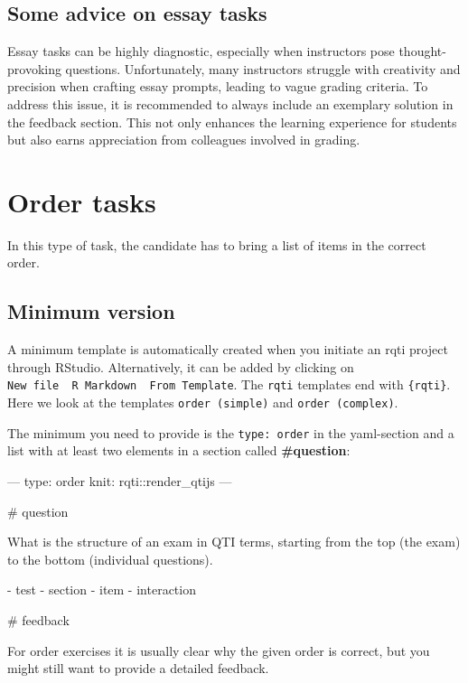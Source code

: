 \documentclass[twoside]{tufte-book}
\newenvironment{Shaded}{}{}
\begin{document}
\section{Some advice on essay tasks}\label{some-advice-on-essay-tasks}

Essay tasks can be highly diagnostic, especially when instructors pose thought-provoking questions. Unfortunately, many instructors struggle with creativity and precision when crafting essay prompts, leading to vague grading criteria. To address this issue, it is recommended to always include an exemplary solution in the feedback section. This not only enhances the learning experience for students but also earns appreciation from colleagues involved in grading.

\chapter{Order tasks}\label{order-tasks}

In this type of task, the candidate has to bring a list of items in the correct order.

\section{Minimum version}\label{minimum-version-5}

A minimum template is automatically created when you initiate an rqti project through RStudio. Alternatively, it can be added by clicking on \texttt{New\ file\ \textrightarrow{}\ R\ Markdown\ \textrightarrow{}\ From\ Template}. The \texttt{rqti} templates end with \texttt{\{rqti\}}. Here we look at the templates \texttt{order\ (simple)} and \texttt{order\ (complex)}.

The minimum you need to provide is the \texttt{type:\ order} in the yaml-section and a list with at least two elements in a section called \textbf{\#question}:

\begin{Shaded}
\begin{Highlighting}
---
type: order
knit: rqti::render_qtijs
---

# question

What is the structure of an exam in QTI terms, starting from the top (the exam)
to the bottom (individual questions).

- test
- section
- item
- interaction

# feedback

For order exercises it is usually clear why the given order is correct, but you
might still want to provide a detailed feedback.
\end{Highlighting}
\end{Shaded}
\end{document}
